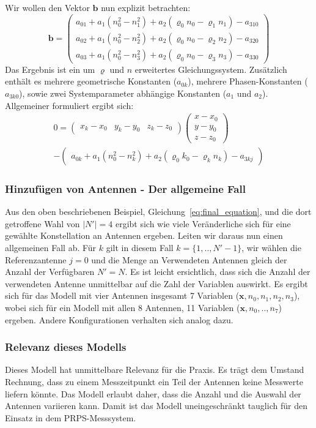 {%
Wir wollen den Vektor $\mathbf{b}$ nun explizit betrachten:
%
\begin{equation}
\mathbf{b}=
\left(
	\begin{array}{c}
		a_{01}+a_1( n_0^2-n_1^2)+a_2(\varrho_0n_0-\varrho_1n_1)-a_{310} \\
		a_{02}+a_1(n_0^2-n_2^2)+a_2(\varrho_0n_0-\varrho_2n_2)-a_{320} \\
		a_{03}+a_1(n_0^2-n_3^2)+a_2(\varrho_0n_0-\varrho_3n_3)-a_{330}
	\end{array}
\right)
\end{equation}
%
Das Ergebnis ist ein um $\varrho$ und $n$ erweitertes Gleichungssystem. Zusätzlich enthält  es mehrere geometrische Konstanten ($a_{0k}$), mehrere Phasen-Konstanten ($a_{3k0}$), sowie zwei Systemparameter abhängige Konstanten ($a_1$ und $a_2$). Allgemeiner formuliert ergibt sich:
%
\begin{multline}\label{eq:final_equation}
0=
\left(
	\begin{array}{ccc}
		x_k-x_0 & y_k-y_0 & z_k-z_0 
	\end{array}
\right)
\left(
   \begin{array}{c}
	   x-x_0\\
	   y-y_0\\
	   z-z_0
   \end{array}
\right) \\
-
\left(
	\begin{array}{c}
		a_{0k}+a_1(n_0^2-n_k^2)+a_2(\varrho_0k_0-\varrho_kn_k)-a_{3kj}
	\end{array}
	\right)
\end{multline}
%
\subsubsection{Hinzufügen von Antennen - Der allgemeine Fall}
Aus den oben beschriebenen Beispiel, Gleichung~\eqref{eq:final_equation}, und die dort getroffene Wahl von $|N'|=4$ ergibt sich wie viele Veränderliche sich für eine gewählte Konstellation an Antennen ergeben. Leiten wir daraus nun einen allgemeinen Fall ab. Für $k$ gilt in diesem Fall $k=\{1,..,N'-1\}$, wir wählen die Referenzantenne $j=0$ und die Menge an Verwendeten Antennen gleich der Anzahl der Verfügbaren $N'=N$. Es ist leicht ersichtlich, dass sich die Anzahl der verwendeten Antenne unmittelbar auf die Zahl der Variablen auswirkt. Es ergibt sich für das Modell mit vier Antennen insgesamt 7 Variablen ($\mathbf{x},n_0,n_1,n_2,n_3$), wobei sich für ein Modell mit allen 8 Antennen, 11 Variablen ($\mathbf{x},n_0,..,n_7$) ergeben. Andere Konfigurationen verhalten sich analog dazu.
%
\subsubsection{Relevanz dieses Modells}
Dieses Modell hat unmittelbare Relevanz für die Praxis. Es trägt dem Umstand Rechnung, dass zu einem Messzeitpunkt ein Teil der Antennen keine Messwerte liefern könnte. Das Modell erlaubt daher, dass die Anzahl und die Auswahl der Antennen variieren kann. Damit ist das Modell uneingeschränkt tauglich für den Einsatz in dem PRPS-Messsystem.\\
}